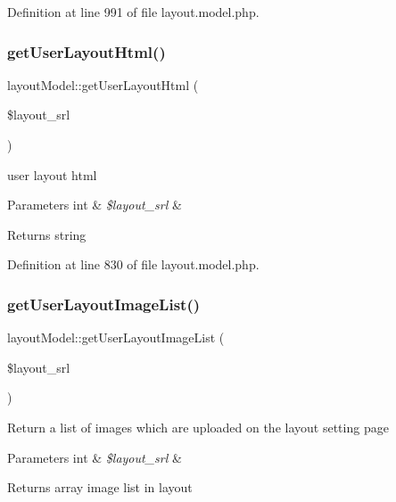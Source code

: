 Definition at line 991 of file layout.\+model.\+php.

\mbox{\label{classlayoutModel_ae1d2250f4bb3703f82998937c46a0a57}} 
\subsubsection{\texorpdfstring{get\+User\+Layout\+Html()}{getUserLayoutHtml()}}
{\footnotesize\ttfamily layout\+Model\+::get\+User\+Layout\+Html (\begin{DoxyParamCaption}\item[{}]{\$layout\+\_\+srl }\end{DoxyParamCaption})}

user layout html 
\begin{DoxyParams}[1]{Parameters}
int & {\em \$layout\+\_\+srl} & \\
\hline
\end{DoxyParams}
\begin{DoxyReturn}{Returns}
string 
\end{DoxyReturn}


Definition at line 830 of file layout.\+model.\+php.

\mbox{\label{classlayoutModel_a6bb9dc3b7dc427d7916bf2a743b8e412}} 
\subsubsection{\texorpdfstring{get\+User\+Layout\+Image\+List()}{getUserLayoutImageList()}}
{\footnotesize\ttfamily layout\+Model\+::get\+User\+Layout\+Image\+List (\begin{DoxyParamCaption}\item[{}]{\$layout\+\_\+srl }\end{DoxyParamCaption})}

Return a list of images which are uploaded on the layout setting page 
\begin{DoxyParams}[1]{Parameters}
int & {\em \$layout\+\_\+srl} & \\
\hline
\end{DoxyParams}
\begin{DoxyReturn}{Returns}
array image list in layout 
\end{DoxyReturn}


